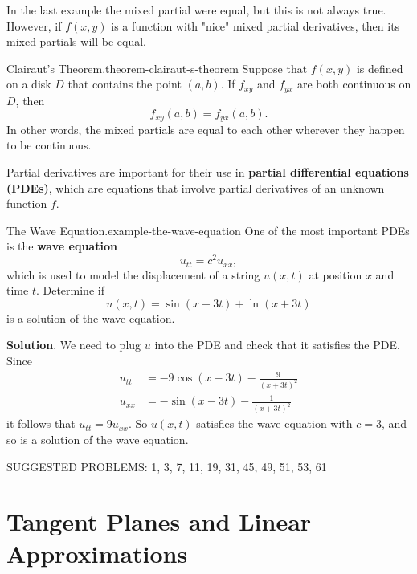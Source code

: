 \documentclass[10pt,]{book}
\newcommand{\terminology}[1]{\textbf{#1}}
\numberwithin{equation}{section}
\begin{document}
\hypertarget{p-1364}{}%
In the last example the mixed partial were equal, but this is not always true. However, if \(f(x,y)\) is a function with "nice" mixed partial derivatives, then its mixed partials will be equal.%
\begin{theorem}{Clairaut's Theorem.}{}{theorem-clairaut-s-theorem}%
\hypertarget{p-1365}{}%
Suppose that \(f(x,y)\) is defined on a disk \(D\) that contains the point \((a,b)\). If \(f_{xy}\) and \(f_{yx}\) are both continuous on \(D\), then%
\begin{equation*}
f_{xy}(a,b) = f_{yx}(a,b).
\end{equation*}
In other words, the mixed partials are equal to each other wherever they happen to be continuous.%
\end{theorem}
\hypertarget{p-1366}{}%
Partial derivatives are important for their use in \terminology{partial differential equations (PDEs)}, which are equations that involve partial derivatives of an unknown function \(f\).%
\begin{example}{The Wave Equation.}{example-the-wave-equation}%
\hypertarget{p-1367}{}%
One of the most important PDEs is the \terminology{wave equation}%
\begin{equation*}
u_{tt} = c^{2}u_{xx},
\end{equation*}
which is used to model the displacement of a string \(u(x,t)\) at position \(x\) and time \(t\). Determine if%
\begin{equation*}
u(x,t) = \sin(x-3t) + \ln(x+3t)
\end{equation*}
is a solution of the wave equation.%
\par\smallskip%
\noindent\textbf{Solution}.\hypertarget{solution-220}{}\quad%
\hypertarget{p-1368}{}%
We need to plug \(u\) into the PDE and check that it satisfies the PDE. Since%
\begin{align*}
u_{tt} & = -9\cos(x-3t) - \frac{9}{(x+3t)^{2}} \\
u_{xx} & = -\sin(x-3t) - \frac{1}{(x+3t)^{2}} 
\end{align*}
it follows that \(u_{tt} = 9u_{xx}\). So \(u(x,t)\) satisfies the wave equation with \(c=3\), and so is a solution of the wave equation.%
\end{example}
\hypertarget{p-1369}{}%
SUGGESTED PROBLEMS: 1, 3, 7, 11, 19, 31, 45, 49, 51, 53, 61%
%
%
\typeout{************************************************}
\typeout{************************************************}
%
\section[{Tangent Planes and Linear Approximations}]{Tangent Planes and Linear Approximations}\label{section-tangent-planes-and-linear-approximations}
%
%
\typeout{************************************************}
\typeout{************************************************}
%
\end{document}
